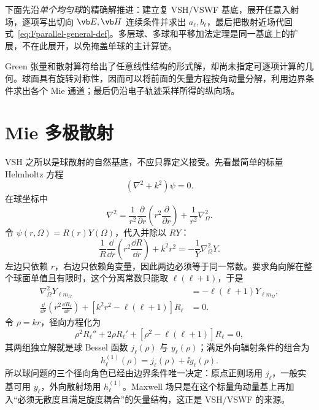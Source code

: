 下面先沿\emph{单个均匀球}的精确解推进：建立复 VSH/VSWF 基底，展开任意入射场，逐项写出切向 $\vb E,\vb H$ 连续条件并求出 $a_\ell,b_\ell$，最后把散射近场代回式~\cref{eq:Fparallel-general-def}。多层球、多球和平移加法定理是同一基底上的扩展，不在此展开，以免掩盖单球的主计算链。


\par\medskip
Green 张量和散射算符给出了任意线性结构的形式解，却尚未指定可逐项计算的几何。球面具有旋转对称性，因而可以将前面的矢量方程按角动量分解，利用边界条件求出各个 Mie 通道；最后仍沿电子轨迹采样所得的纵向场。
\par\medskip


\section{Mie 多极散射}

VSH 之所以是球散射的自然基底，不应只靠定义接受。先看最简单的标量 Helmholtz 方程
\begin{equation}
(\nabla^2+k^2)\psi=0.
\label{eq:scalar-helmholtz-mie}
\end{equation}
在球坐标中
\begin{equation}
\nabla^2
=\frac{1}{r^2}\frac{\partial}{\partial r}
\left(r^2\frac{\partial}{\partial r}\right)
+\frac{1}{r^2}\nabla_\Omega^2.
\end{equation}
令 $\psi(r,\Omega)=R(r)Y(\Omega)$，代入并除以 $RY$：
\begin{equation}
\frac{1}{R}\frac{\dd}{\dd r}\left(r^2\frac{\dd R}{\dd r}\right)
+k^2r^2
=-\frac{1}{Y}\nabla_\Omega^2Y.
\end{equation}
左边只依赖 $r$，右边只依赖角变量，因此两边必须等于同一常数。要求角向解在整个球面单值且有限时，这个分离常数只能取 $\ell(\ell+1)$，于是
\begin{align}
\nabla_\Omega^2Y_{\ell m_\Omega}
&=-\ell(\ell+1)Y_{\ell m_\Omega},\\
\frac{\dd}{\dd r}\left(r^2\frac{\dd R_\ell}{\dd r}\right)
+\left[k^2r^2-\ell(\ell+1)\right]R_\ell&=0.
\label{eq:spherical-radial-equation}
\end{align}
令 $\rho=kr$，径向方程化为
\begin{equation}
\rho^2R_\ell''+2\rho R_\ell'
+\left[\rho^2-\ell(\ell+1)\right]R_\ell=0,
\end{equation}
其两组独立解就是球 Bessel 函数 $j_\ell(\rho)$ 与 $y_\ell(\rho)$；满足外向辐射条件的组合为
\begin{equation}
h_\ell^{(1)}(\rho)=j_\ell(\rho)+\ii y_\ell(\rho).
\end{equation}
所以球问题的三个径向角色已经由边界条件唯一决定：原点正则场用 $j_\ell$，一般实基可用 $y_\ell$，外向散射场用 $h_\ell^{(1)}$。Maxwell 场只是在这个标量角动量基上再加入“必须无散度且满足旋度耦合”的矢量结构，这正是 VSH/VSWF 的来源。

